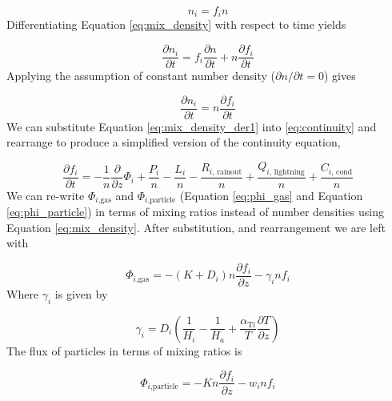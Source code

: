 \begin{equation} \label{eq:mix_density}
  n_i = f_i n
\end{equation}
Differentiating Equation \eqref{eq:mix_density} with respect to time yields

\begin{equation} \label{eq:mix_density_der}
  \frac{\partial n_i}{\partial t} = f_i \frac{\partial n}{\partial t} + n \frac{\partial f_i}{\partial t}
\end{equation}
Applying the assumption of constant number density ($\partial n / \partial t = 0$) gives

\begin{equation} \label{eq:mix_density_der1}
  \frac{\partial n_i}{\partial t} = n \frac{\partial f_i}{\partial t}
\end{equation}
We can substitute Equation \eqref{eq:mix_density_der1} into \eqref{eq:continuity} and rearrange to produce a simplified version of the continuity equation,

\begin{equation} \label{eq:continuity_simple}
  \frac{\partial f_{i}}{\partial t} = - \frac{1}{n}\frac{\partial}{\partial z}\Phi_{i} + \frac{P_{i}}{n} - \frac{L_{i}}{n} - \frac{R_{i\text{, rainout}}}{n} + \frac{Q_{i\text{, lightning}}}{n} + \frac{C_{i\text{, cond}}}{n}
\end{equation}
We can re-write $\Phi_{i\text{,gas}}$ and $\Phi_{i\text{,particle}}$ (Equation \eqref{eq:phi_gas} and Equation \eqref{eq:phi_particle}) in terms of mixing ratios instead of number densities using Equation \eqref{eq:mix_density}. After substitution, and rearrangement we are left with

\begin{equation} \label{eq:phi_gas_1}
  \Phi_{i\text{,gas}} = - \left( K + D_{i} \right)n\frac{\partial f_{i}}{\partial z} - \gamma_{i}nf_{i}
\end{equation}
Where $\gamma_{i}$ is given by

\begin{equation}
  \gamma_{i} = D_{i}\left( \frac{1}{H_{i}} - \frac{1}{H_{a}} + \frac{\alpha_{\text{Ti}}}{T}\frac{\partial T}{\partial z} \right)
\end{equation}
The flux of particles in terms of mixing ratios is

\begin{equation} \label{eq:phi_particle_1}
  \Phi_{i\text{,particle}} = - Kn\frac{\partial f_{i}}{\partial z} - w_i n f_{i}
\end{equation}

